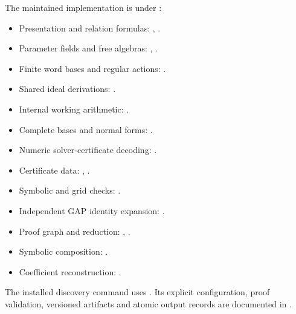 \documentclass[11pt]{article}
\begin{document}
The maintained implementation is under :
\begin{itemize}
\small
\setlength{\itemsep}{0pt}
\setlength{\parskip}{0pt}
\setlength{\parsep}{0pt}
\item Presentation and relation formulas: , .
\item Parameter fields and free algebras: , .
\item Finite word bases and regular actions: .
\item Shared ideal derivations: .
\item Internal working arithmetic: .
\item Complete bases and normal forms: .
\item Numeric solver-certificate decoding: .
\item Certificate data: , .
\item Symbolic and grid checks: .
\item Independent GAP identity expansion: .
\item Proof graph and reduction: , .
\item Symbolic composition: .
\item Coefficient reconstruction: .
\end{itemize}
The installed discovery command uses . Its explicit configuration, proof validation, versioned artifacts and atomic output records are documented in .
\end{document}
